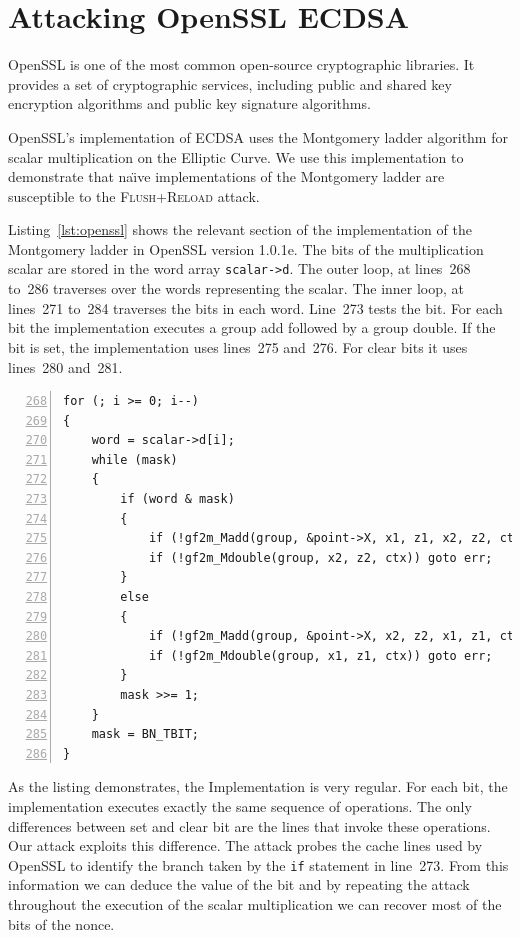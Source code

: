 \documentclass{llncs}
\begin{document}
\section{Attacking OpenSSL ECDSA}\label{sec:attack}
OpenSSL is one of the most common open-source cryptographic libraries.
It provides a set of cryptographic services, including public and shared key encryption 
algorithms and public key signature algorithms.

OpenSSL's implementation of ECDSA uses the Montgomery ladder algorithm for scalar multiplication
on the Elliptic Curve.
We use this implementation to demonstrate that na{\"\i}ve implementations of the Montgomery ladder are
susceptible to the \textsc{Flush+Reload} attack.

Listing~\ref{lst:openssl} shows the relevant section of the implementation of the Montgomery ladder in OpenSSL version 1.0.1e.
The bits of the multiplication scalar are stored in the word array \texttt{scalar->d}.
The outer loop, at lines~268 to~286 traverses over the words representing the scalar.
The inner loop, at lines~271 to~284 traverses the bits in each word.
Line~273 tests the bit. 
For each bit the implementation executes a group add followed by a group double.
If the bit is set, the implementation uses lines~275 and~276.
For clear bits it uses lines~280 and~281.

\begin{lstlisting}[numbers=left,firstnumber=268,float=htb,caption=OpenSSL Implementation of the Montgomery Ladder,label=lst:openssl]
for (; i >= 0; i--)
{
    word = scalar->d[i];
    while (mask)
    {
        if (word & mask)
        {
            if (!gf2m_Madd(group, &point->X, x1, z1, x2, z2, ctx)) goto err;
            if (!gf2m_Mdouble(group, x2, z2, ctx)) goto err;
        }
        else
        {
            if (!gf2m_Madd(group, &point->X, x2, z2, x1, z1, ctx)) goto err;
            if (!gf2m_Mdouble(group, x1, z1, ctx)) goto err;
        }
        mask >>= 1;
    }
    mask = BN_TBIT;
}
\end{lstlisting}

As the listing demonstrates, the Implementation is very regular.
For each bit, the implementation executes exactly the same sequence of operations.
The only differences between set and clear bit are the lines that invoke these operations.
Our attack exploits this difference.
The attack probes the cache lines used by OpenSSL to identify the branch taken by the \texttt{if}
statement in line~273.
From this information we can deduce the value of the bit and by repeating the attack throughout
the execution of the scalar multiplication we can recover most of the bits of the nonce.
\end{document}
